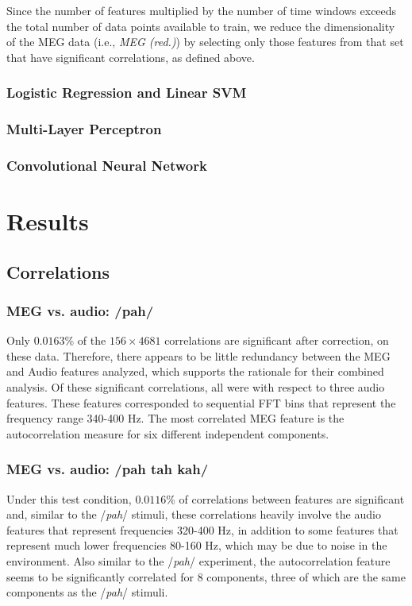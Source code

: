 \documentclass[utf8]{frontiersSCNS} %
\begin{document}
Since the number of features multiplied by the number of time windows exceeds the total number of data points available to train, we reduce the dimensionality of the MEG data (i.e., {\em MEG (red.)}) by selecting only those features from that set that have significant correlations, as defined above.

\subsubsection{Logistic Regression and Linear SVM}

\subsubsection{Multi-Layer Perceptron}

\subsubsection{Convolutional Neural Network}

\section{Results}

\subsection{Correlations}

\subsubsection{MEG vs. audio: /pah/}

Only $0.0163$\% of the $156 \times 4681$ correlations are significant after correction, on these data. Therefore, there appears to be little redundancy between the MEG and Audio features analyzed, which supports the rationale for their combined analysis. Of these significant correlations, all were with respect to three audio features. These features corresponded to sequential FFT bins that represent the frequency range 340-400 Hz. The most correlated MEG feature is the autocorrelation measure for six different independent components.

\subsubsection{MEG vs. audio: /pah tah kah/}

Under this test condition, $0.0116$\% of correlations between features are significant and, similar to the /{\em pah}/ stimuli, these correlations heavily involve the audio features that represent frequencies 320-400 Hz, in addition to some features that represent much lower frequencies 80-160 Hz, which may be due to noise in the environment. Also similar to the /{\em pah}/ experiment, the autocorrelation feature seems to be significantly correlated for 8 components, three of which are the same components as the /{\em pah}/ stimuli.
\end{document}
